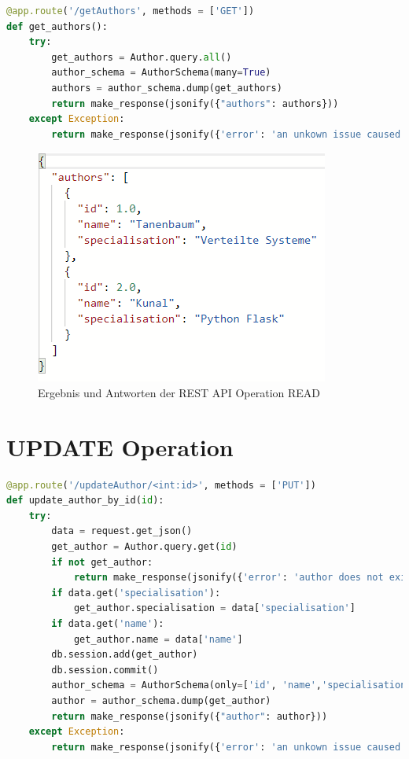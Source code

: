 \documentclass[a4paper,titlepage,halfparskip,12pt,listof=numbered]{scrreprt}
\begin{document}
\begin{lstlisting}[language=python,caption={Code für die READ Operation der CRUD-Applikation}, label={lst:readOperationAPI}]
@app.route('/getAuthors', methods = ['GET'])
def get_authors():
    try:
        get_authors = Author.query.all()
        author_schema = AuthorSchema(many=True)
        authors = author_schema.dump(get_authors)
        return make_response(jsonify({"authors": authors}))
    except Exception:
        return make_response(jsonify({'error': 'an unkown issue caused this error.'}), 500)
\end{lstlisting}

\bigskip

\begin{figure}[h]
	\centering
	\includegraphics[width=.6\linewidth]{images/readResult}
	\caption{Ergebnis und Antworten der \ac{REST} \ac{API} Operation READ}
	\label{img:resultsREAD}
\end{figure}

\pagebreak

\section{UPDATE Operation}

\begin{lstlisting}[language=python,caption={Code für die UPDATE Operation der CRUD-Applikation}, label={lst:updateOperationAPI}]
@app.route('/updateAuthor/<int:id>', methods = ['PUT'])
def update_author_by_id(id):
    try:
        data = request.get_json()
        get_author = Author.query.get(id)
        if not get_author:
            return make_response(jsonify({'error': 'author does not exist.'}), 404)
        if data.get('specialisation'):
            get_author.specialisation = data['specialisation']
        if data.get('name'):
            get_author.name = data['name']
        db.session.add(get_author)
        db.session.commit()
        author_schema = AuthorSchema(only=['id', 'name','specialisation'])
        author = author_schema.dump(get_author)
        return make_response(jsonify({"author": author}))
    except Exception:
        return make_response(jsonify({'error': 'an unkown issue caused this error.'}), 500)
\end{lstlisting}
\end{document}
